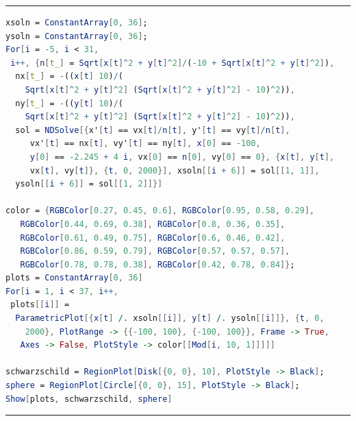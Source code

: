 \documentclass[%
 reprint,
 amsmath,amssymb,
 aps,
floatfix,
]{revtex4-1}
\begin{document}
\onecolumngrid
\vspace{12pt}
\hrule
\begin{lstlisting}[language=Mathematica]
xsoln = ConstantArray[0, 36];
ysoln = ConstantArray[0, 36];
For[i = -5, i < 31, 
 i++, {n[t_] = Sqrt[x[t]^2 + y[t]^2]/(-10 + Sqrt[x[t]^2 + y[t]^2]), 
  nx[t_] = -((x[t] 10)/(
    Sqrt[x[t]^2 + y[t]^2] (Sqrt[x[t]^2 + y[t]^2] - 10)^2)), 
  ny[t_] = -((y[t] 10)/(
    Sqrt[x[t]^2 + y[t]^2] (Sqrt[x[t]^2 + y[t]^2] - 10)^2)), 
  sol = NDSolve[{x'[t] == vx[t]/n[t], y'[t] == vy[t]/n[t], 
     vx'[t] == nx[t], vy'[t] == ny[t], x[0] == -100, 
     y[0] == -2.245 + 4 i, vx[0] == n[0], vy[0] == 0}, {x[t], y[t], 
     vx[t], vy[t]}, {t, 0, 2000}], xsoln[[i + 6]] = sol[[1, 1]], 
  ysoln[[i + 6]] = sol[[1, 2]]}]
  
color = {RGBColor[0.27, 0.45, 0.6], RGBColor[0.95, 0.58, 0.29], 
   RGBColor[0.44, 0.69, 0.38], RGBColor[0.8, 0.36, 0.35], 
   RGBColor[0.61, 0.49, 0.75], RGBColor[0.6, 0.46, 0.42], 
   RGBColor[0.86, 0.59, 0.79], RGBColor[0.57, 0.57, 0.57], 
   RGBColor[0.78, 0.78, 0.38], RGBColor[0.42, 0.78, 0.84]};
plots = ConstantArray[0, 36]
For[i = 1, i < 37, i++, 
 plots[[i]] = 
  ParametricPlot[{x[t] /. xsoln[[i]], y[t] /. ysoln[[i]]}, {t, 0, 
    2000}, PlotRange -> {{-100, 100}, {-100, 100}}, Frame -> True, 
   Axes -> False, PlotStyle -> color[[Mod[i, 10, 1]]]]]
   
schwarzschild = RegionPlot[Disk[{0, 0}, 10], PlotStyle -> Black];
sphere = RegionPlot[Circle[{0, 0}, 15], PlotStyle -> Black];
Show[plots, schwarzschild, sphere]
\end{lstlisting}
\hrule
\vspace{24pt}
\end{document}

